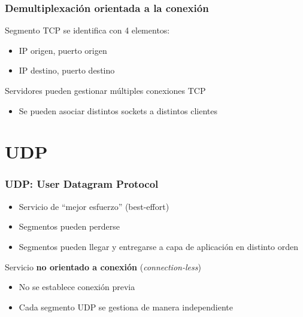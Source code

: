 \documentclass[letter]{beamer}
\begin{document}
\begin{frame}
  \frametitle{Demultiplexación orientada a la conexión}

  Segmento TCP se identifica con 4 elementos:
  \begin{itemize}
    \item IP origen, puerto origen
    \item IP destino, puerto destino
  \end{itemize}
  Servidores pueden gestionar múltiples conexiones TCP
  \begin{itemize}
    \item Se pueden asociar distintos sockets a distintos clientes
  \end{itemize}
\end{frame}

\section{UDP}

\begin{frame}
  \frametitle{UDP: User Datagram Protocol}
  
  \begin{itemize}
    \item Servicio de ``mejor esfuerzo'' (best-effort)
    \item Segmentos pueden perderse
    \item Segmentos pueden llegar y entregarse a capa de aplicación en distinto orden
  \end{itemize}
  Servicio {\bf no orientado a conexión} ({\em connection-less})
  \begin{itemize}
    \item No se establece conexión previa
    \item Cada segmento UDP se gestiona de manera independiente
  \end{itemize}
\end{frame}
\end{document}
